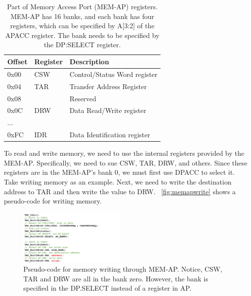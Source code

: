 \begin{center}
	\begin{table}
		\small
		\begin{tabular}{l l l} 
			\hline
			Offset & Register &  Description  \\ 
			\hline
			0x00 & CSW & Control/Status Word register \\
			\hline
			0x04 & TAR & Transfer Address Register \\
			\hline
			0x08 & & Reserved \\
			\hline
			0x0C & DRW & Data Read/Write register\\
			\hline
			... & & \\
			\hline
			0xFC & IDR & Data Identification register\\
			\hline
		\end{tabular}
		\caption{Part of Memory Access Port (MEM-AP) registers. MEM-AP has 16 banks, and each bank has four registers, which can be specified by A[3:2] of the APACC register. The bank needs to be specified by the DP:SELECT register.}
		\label{tab:memapreg}
	\end{table}
\end{center}





To read and write memory, we need to use the internal registers provided by the MEM-AP. Specifically, we need to sue CSW, TAR, DRW, and others. Since these registers are in the MEM-AP's bank 0, we must first use DPACC to select it. Take writing memory as an example. Next, we need to write the destination address to TAR and then write the value to DRW. ~\autoref{fig:memapwrite} shows a pseudo-code for writing memory.


\begin{figure}[ht]
	\includegraphics[width=0.47\textwidth]{figures/memapwrite2}
	\centering
	\caption{Pseudo-code for memory writing through MEM-AP. Notice, CSW, TAR and DRW are all in the bank zero. However, the bank is specified in the DP.SELECT instead of a register in AP.}
	\label{fig:memapwrite}
\end{figure}





